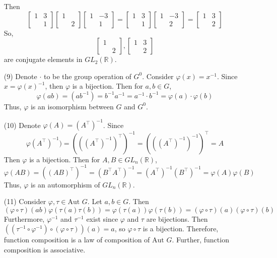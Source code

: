 \documentclass[12pt]{article}
\begin{document}
\begin{itemize}
Then
$$\begin{bmatrix}
1 & 3 \\
& 1
\end{bmatrix}\begin{bmatrix}
1 \\
& 2
\end{bmatrix}\begin{bmatrix}
1 & -3 \\
& 1
\end{bmatrix} = \begin{bmatrix}
1 & 3 \\
& 1
\end{bmatrix}\begin{bmatrix}
1 & -3 \\
& 2
\end{bmatrix} = \begin{bmatrix}
1 & 3 \\
& 2
\end{bmatrix}$$
So,
$$\begin{bmatrix}
1 \\
& 2
\end{bmatrix}, \begin{bmatrix}
1 & 3 \\
& 2
\end{bmatrix}$$
are conjugate elements in $GL_2(\mathbb{R})$.
\item[(9)]
Denote $\cdot$ to be the group operation of $G^0$. Consider $\varphi(x) = x^{-1}$. Since $x = \varphi(x)^{-1}$, then $\varphi$ is a bijection. Then for $a, b \in G$,
$$\varphi(ab) = (ab^{-1}) = b^{-1}a^{-1} = a^{-1} \cdot b^{-1} = \varphi(a) \cdot \varphi(b)$$
Thus, $\varphi$ is an isomorphism between $G$ and $G^0$.
\item[(10)]
Denote $\varphi(A) = (A^\top)^{-1}$. Since 
$$\varphi(A^\top)^{-1}) = (((A^\top)^{-1})^\top)^{-1} = (((A^\top)^{-1})^{-1})^\top = A$$
Then $\varphi$ is a bijection. Then for $A, B \in GL_n(\mathbb{R})$,
$$\varphi(AB) = ((AB)^\top)^{-1} = (B^\top A^\top)^{-1} = (A^\top)^{-1}(B^\top)^{-1} = \varphi(A)\varphi(B)$$
Thus, $\varphi$ is an automorphism of $GL_n(\mathbb{R})$.
\item[(11)]
Consider $\varphi, \tau \in \text{Aut }G$. Let $a, b \in G$. Then
$$(\varphi \circ \tau)(ab) \varphi(\tau(a)\tau(b)) = \varphi(\tau(a))\varphi(\tau(b)) = (\varphi \circ \tau)(a)(\varphi \circ \tau)(b)$$
Furthermore, $\varphi^{-1}$ and $\tau^{-1}$ exist since $\varphi$ and $\tau$ are bijections. Then $((\tau^{-1} \circ \varphi^{-1}) \circ (\varphi \circ \tau))(a) = a$, so $\varphi \circ \tau$ is a bijection. Therefore, function composition is a law of composition of $\text{Aut }G$. Further, function composition is associative. 


\end{itemize}
\end{document}
